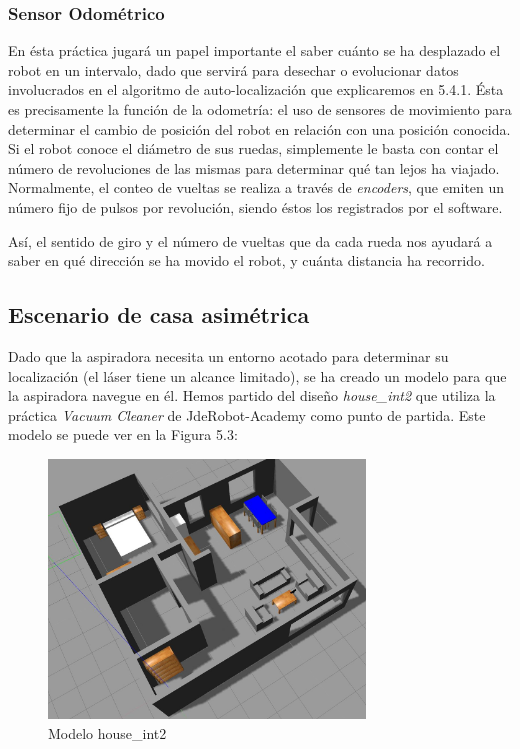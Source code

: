 \subsubsection{Sensor Odométrico}
En ésta práctica jugará un papel importante el saber cuánto se ha desplazado el robot en un intervalo, dado que servirá para desechar o evolucionar datos involucrados en el algoritmo de auto-localización que explicaremos en 5.4.1. Ésta es precisamente la función de la odometría: el uso de sensores de movimiento para determinar el cambio de posición del robot en relación con una posición conocida. Si el robot conoce el diámetro de sus ruedas, simplemente le basta con contar el número de revoluciones de las mismas para determinar qué tan lejos ha viajado. Normalmente, el conteo de vueltas se realiza a través de \textit{encoders}, que emiten un número fijo de pulsos por revolución, siendo éstos los registrados por el software.

Así, el sentido de giro y el número de vueltas que da cada rueda nos ayudará a saber en qué dirección se ha movido el robot, y cuánta distancia ha recorrido.

\subsection{Escenario de casa asimétrica} 
Dado que la aspiradora necesita un entorno acotado para determinar su localización (el láser tiene un alcance limitado), se ha creado un modelo para que la aspiradora navegue en él.
Hemos partido del diseño \textit{house\_int2} que utiliza la práctica \textit{Vacuum Cleaner} de JdeRobot-Academy como punto de partida. Este modelo se puede ver en la Figura 5.3:

\begin{figure}[H]
  \begin{center}
    \includegraphics[width=0.75\textwidth]{figures/houseint.jpg}
		\caption{Modelo house\_int2}
		\label{fig.houseint}
		\end{center}
\end{figure}


